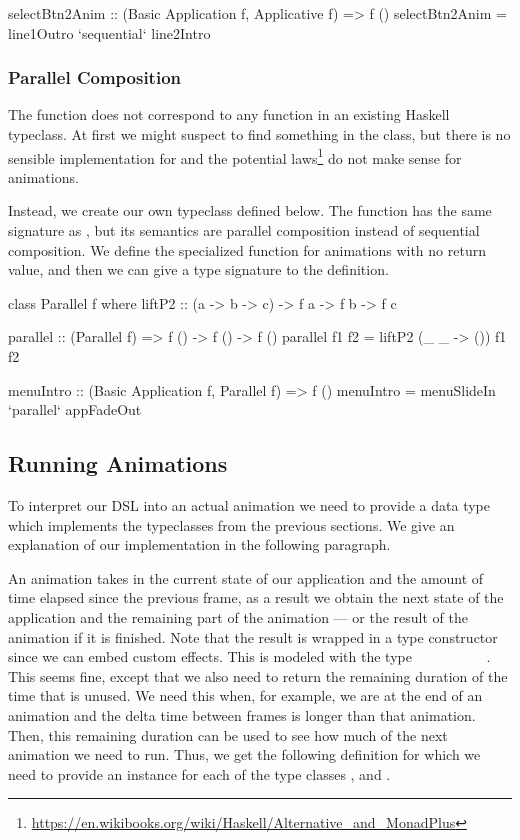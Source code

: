 \begin{code}
selectBtn2Anim :: (Basic Application f, Applicative f) => f ()
selectBtn2Anim = line1Outro `sequential` line2Intro
\end{code}

\subsubsection{Parallel Composition}

The  function does not correspond to any function in an existing Haskell typeclass. At first we might suspect to find something in the  class, but there is no sensible implementation for  and the potential laws\footnote{\url{https://en.wikibooks.org/wiki/Haskell/Alternative_and_MonadPlus}} do not make sense for animations.

Instead, we create our own  typeclass defined below. The function  has the same signature as , but its semantics are parallel composition instead of sequential composition. We define the specialized  function for animations with no return value, and then we can give a type signature to the  definition.

\begin{code}
class Parallel f where
  liftP2 :: (a -> b -> c) -> f a -> f b -> f c

parallel :: (Parallel f) => f () -> f () -> f ()
parallel f1 f2 = liftP2 (\_ _ -> ()) f1 f2

menuIntro :: (Basic Application f, Parallel f) => f ()
menuIntro = menuSlideIn `parallel` appFadeOut
\end{code}

\subsection{Running Animations}

To interpret our DSL into an actual animation we need to provide a data type which implements the typeclasses from the previous sections. We give an explanation of our implementation in the following paragraph.

An animation takes in the current state of our application and the amount of time elapsed since the previous frame, as a result we obtain the next state of the application and the remaining part of the animation --- or the result of the animation if it is finished. Note that the result is wrapped in a type constructor  since we can embed custom effects. This is modeled with the type ~\hs{->}~~\hs{->}~~~~~~~. This seems fine, except that we also need to return the remaining duration of the time that is unused. We need this when, for example, we are at the end of an animation and the delta time between frames is longer than that animation. Then, this remaining duration can be used to see how much of the next animation we need to run. Thus, we get the following definition for which we need to provide an instance for each of the type classes ,  and .

